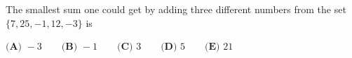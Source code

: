The smallest sum one could get by adding three different numbers from the set $\{7,25,-1,12,-3\}$ is

$\textbf{(A) }-3\qquad\textbf{(B) }-1\qquad\textbf{(C) }3\qquad\textbf{(D) }5\qquad\textbf{(E) }21$
